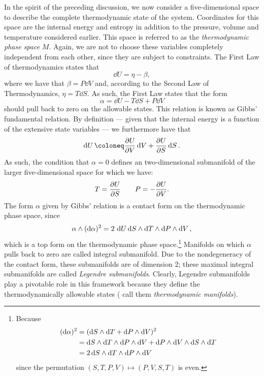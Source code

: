 In the spirit of the preceding discussion, we now consider a five-dimensional space to describe the complete thermodynamic state of the system. Coordinates for this space are the internal energy and entropy in addition to the pressure, volume and temperature considered earlier. This space is referred to as the \emph{thermodynamic phase space} $M$. Again, we are not to choose these variables completely independent from each other, since they are subject to constraints. The First Law of thermodynamics states that
$$ \dd{U} = \eta - \beta, $$
where we have that $ \beta = P\dd{V} $ and, according to the Second Law of Thermodynamics, $ \eta = T\dd{S} $. As such, the First Law states that the form
\begin{equation} 
    \alpha = \dd{U} - T\dd{S} + P\dd{V}
    \label{eq:gibbs_relation}
\end{equation}
should pull back to zero on the allowable states. This relation is known as Gibbs' fundamental relation. By definition --- given that the internal energy is a function of the extensive state variables ---  we furthermore have that
$$ \dd{U} \coloneq \pdv{U}{V}\dd{V} + \pdv{U}{S}\dd{S}.$$
As such, the condition that $\alpha = 0$ defines an two-dimensional submanifold of the larger five-dimensional space for which we have:
\begin{equation}
    T = \pdv{U}{S} \qquad P = -\pdv{U}{V}. 
\end{equation}
The form $\alpha$ given by Gibbs' relation is a contact form on the thermodynamic phase space, since
$$  \alpha\wedge(\dd{\alpha})^2  = 2\,\dd{U}  \dd{S}\wedge\dd{T} \wedge \dd{P}\wedge\dd{V}  , $$
which is a top form on the thermodynamic phase space.\footnote
{
    Because 
    \begin{equation*} 
        \begin{split}
            (\dd{\alpha})^2 &= ( \dd{S}\wedge\dd{T}  +  \dd{P}\wedge\dd{V} )^2 \\
                            &=   \dd{S}\wedge\dd{T} \wedge \dd{P}\wedge\dd{V}   +   \dd{P}\wedge\dd{V} \wedge \dd{S}\wedge\dd{T}   \\
                            &= 2  \dd{S}\wedge\dd{T} \wedge \dd{P}\wedge\dd{V}   \\
        \end{split}
    \end{equation*}
    since the permutation $ (S, T, P, V) \mapsto (P, V, S, T) $ is even.
}
Manifolds on which $\alpha$ pulls back to zero are called integral submanifold. Due to the nondegeneracy of the contact form, these submanifolds are of dimension 2; these maximal integral submanifolds are called \emph{Legendre submanifolds}. Clearly, Legendre submanifolds play a pivotable role in this framework because they define the thermodynamically allowable states (\citet{Balian2001} call them \emph{thermodynamic manifolds}).


